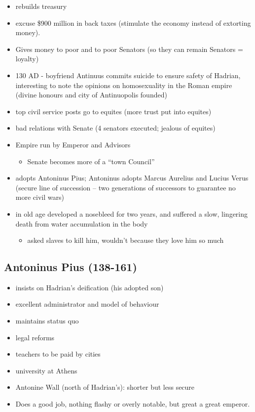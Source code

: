 \documentclass[12pt, twoside]{article}
\begin{document}
\begin{itemize}
\begin{itemize}
	\end{itemize}
\item rebuilds treasury
\item excuse \$900 million in back taxes (stimulate the economy instead of extorting money).
\item Gives money to poor and to poor Senators (so they can remain Senators = loyalty)
\item 130 AD - boyfriend Antinuus commits suicide to ensure safety of Hadrian, interesting to note the opinions on homosexuality in the Roman empire (divine honours and city of Antinuopolis founded)
\item top civil service posts go to equites (more trust put into equites)
\item bad relations with Senate (4 senators executed; jealous of equites)
\item Empire run by Emperor and Advisors
	\begin{itemize}
	\item Senate becomes more of a “town Council”
	\end{itemize}
\item adopts Antoninus Pius; Antoninus adopts Marcus Aurelius and Lucius Verus (secure line of succession – two generations of successors to guarantee no more civil wars)
\item in old age developed a nosebleed for two years, and suffered a slow, lingering death from water accumulation in the body
	\begin{itemize}
	\item asked slaves to kill him, wouldn't because they love him so much
	\end{itemize}
\end{itemize}

\subsection{Antoninus Pius (138-161)}
\begin{itemize}
\item insists on Hadrian's deification (his adopted son)
\item excellent administrator and model of behaviour
\item maintains status quo
\item legal reforms
\item teachers to be paid by cities
\item university at Athens
\item Antonine Wall (north of Hadrian's): shorter but less secure
\item Does a good job, nothing flashy or overly notable, but great a great emperor.
\end{itemize}
\end{document}
